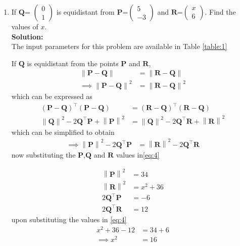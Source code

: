 \documentclass[12pt]{article}
\providecommand{\brak}[1]{\ensuremath{\left(#1\right)}}
\providecommand{\norm}[1]{\left\lVert#1\right\rVert}
\newcommand{\solution}{\noindent \textbf{Solution: }}
\newcommand{\myvec}[1]{\ensuremath{\begin{pmatrix}#1\end{pmatrix}}}
\let\vec\mathbf
\begin{document}
\begin{enumerate}

\item If $\vec{Q}$= $\myvec{0\\ 1}$  is equidistant from $\vec{P}$=$\myvec{5 \\ -3}$ and $\vec{R}$=$\myvec{x\\6}$. Find the values of $x$.\\

\solution \\The input parameters for this problem are available in Table \eqref{table:1}
\begin{table}[ht!]\centering  

\caption{}
\label{table:1}	
\end{table}


  If $\vec{Q}$  is  equidistant from the points $\vec{P}$ and $\vec{R}$, 
\begin{align}
 \norm{\vec{P}-\vec{Q}} &=
\norm{\vec{R}-\vec{Q}} 
\\
 \implies \norm{\vec{P}-\vec{Q}}^2 &=
\norm{\vec{R}-\vec{Q}}^2 
\end{align}
which can be expressed as 
\begin{align}
 \brak{\vec{P}-\vec{Q}}^{\top} \brak{\vec{P}-\vec{Q}}&=
 \brak{\vec{R}-\vec{Q}}^{\top} 
\brak{\vec{R}-\vec{Q}}
\\ \norm{\vec{Q}}^2-2{\vec{Q}}^{\top}\vec{P} + \norm{\vec{P}}^2
 &= \norm{\vec{Q}}^2-2{\vec{Q}}^{\top}\vec{R} + \norm{\vec{R}}^2
\end{align}
which can be simplified to obtain
  \begin{align}
   \implies \norm{\vec{P}}^2-2{\vec{Q}}^{\top}\vec{P} &= \norm{\vec{R}}^2-2{\vec{Q}}^{\top}\vec{R} 
\label{eq:4} 
  \end{align}
  now substituting the $\vec{P}$,$\vec{Q}$ and $\vec{R}$ values in\eqref{eq:4}

  \begin{align}
   \norm{\vec{P}}^2 &= 34
  \\ \norm{\vec{R}}^2 &= x^2+36
 \\2{\vec{Q}}^{\top}\vec{P} &= -6
 \\2{\vec{Q}}^{\top}\vec{R} &= 12
 \end{align}
upon   substituting the values in \eqref{eq:4}
\begin{align}
 x^2+36-12 &=34+6 
 \\ \implies  x^2 &=16
\end{align}


\end{enumerate}
\end{document}
